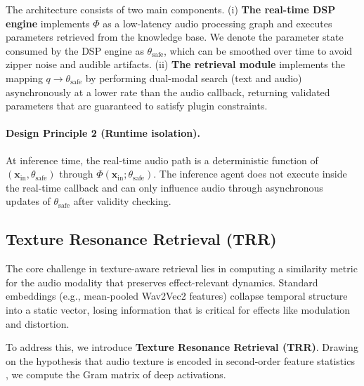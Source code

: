 	The architecture consists of two main components. (i) \textbf{The real-time DSP engine} implements $\Phi$ as a low-latency audio processing graph and executes parameters retrieved from the knowledge base. We denote the parameter state consumed by the DSP engine as $\theta_{\text{safe}}$, which can be smoothed over time to avoid zipper noise and audible artifacts. (ii) \textbf{The retrieval module} implements the mapping $q \to \theta_{\text{safe}}$ by performing dual-modal search (text and audio) asynchronously at a lower rate than the audio callback, returning validated parameters that are guaranteed to satisfy plugin constraints.

		\paragraph{Design Principle 2 (Runtime isolation).}
		At inference time, the real-time audio path is a deterministic function of $(\mathbf{x}_{\text{in}},\theta_{\text{safe}})$ through $\Phi(\mathbf{x}_{\text{in}};\theta_{\text{safe}})$. The inference agent does not execute inside the real-time callback and can only influence audio through asynchronous updates of $\theta_{\text{safe}}$ after validity checking.

\subsection{Texture Resonance Retrieval (TRR)}
\label{ssec:rag}

The core challenge in texture-aware retrieval lies in computing a similarity metric for the audio modality that preserves effect-relevant dynamics. Standard embeddings (e.g., mean-pooled Wav2Vec2 features) collapse temporal structure into a static vector, losing information that is critical for effects like modulation and distortion.

To address this, we introduce \textbf{Texture Resonance Retrieval (TRR)}. Drawing on the hypothesis that audio texture is encoded in second-order feature statistics \citep{mcdermott2011sound}, we compute the Gram matrix of deep activations.

